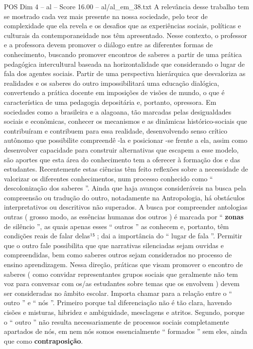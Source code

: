 \begin{textsample}{POS Dim 4 – al – Score 16.00 – al/al\_em\_38.txt}
A relevância desse trabalho tem se mostrado cada vez mais presente na nossa sociedade, pelo teor de complexidade que ela revela e os desafios que as experiências sociais, políticas e culturais da contemporaneidade nos têm apresentado.
Nesse contexto, o professor e a professora devem promover o diálogo entre as diferentes formas de conhecimento, buscando promover encontros de saberes a partir de uma prática pedagógica intercultural baseada na horizontalidade que considerando o lugar de fala dos agentes sociais.
Partir de uma perspectiva hierárquica que desvaloriza as realidades e os saberes do outro impossibilitará uma educação dialógica, convertendo a prática docente em imposições de visões de mundo, o que é característica de uma pedagogia depositária e, portanto, opressora.
Em sociedades como a brasileira e a alagoana, tão marcadas pelas desigualdades sociais e econômicas, conhecer os mecanismos e as dinâmicas histórico-sociais que contribuíram e contribuem para essa realidade, desenvolvendo senso crítico autônomo que possibilite compreendê -la e posicionar -se frente a ela, assim como desenvolver capacidade para construir alternativas que escapem a esse modelo, são aportes que esta área do conhecimento tem a oferecer à formação dos e das estudantes.
Recentemente estas ciências têm feito reflexões sobre a necessidade de valorizar os diferentes conhecimentos, num processo conhecido como “ descolonização dos saberes ”.
Ainda que haja avanços consideráveis na busca pela compreensão ou tradução do outro, notadamente na Antropologia, há obstáculos interpretativos ou descritivos não superados.
A busca por compreender antologias outras ( grosso modo, as essências humanas dos outros ) é marcada por “ \textbf{zonas} de silêncio ”, as quais apenas esses “ outros ” as conhecem e, portanto, têm condições reais de falar delas¹⁵ ; dai a importância do “ lugar de fala ”.
Permitir que o outro fale possibilita que que narrativas silenciadas sejam ouvidas e compreendidas, bem como saberes outros sejam considerados no processo de ensino aprendizagem.
Nessa direção, práticas que visam promover o encontro de saberes ( como convidar representantes grupos sociais que geralmente não tem voz para conversar com os/as estudantes sobre temas que os envolvem ) devem ser consideradas no âmbito escolar.
Importa chamar para a relação entre o “ outro ” e “ nós ”.
Primeiro porque tal diferenciação não é tão clara, havendo cisões e misturas, hibridez e ambiguidade, mesclagens e atritos.
Segundo, porque o “ outro ” não resulta necessariamente de processos sociais completamente apartados de nós, em nem nós somos essencialmente “ formados ” sem eles, ainda que como \textbf{contraposição}.

\end{textsample}
